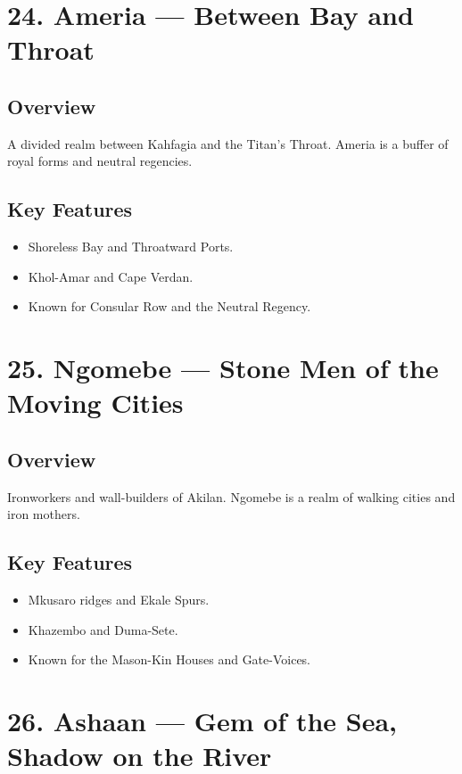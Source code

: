 \documentclass[11pt]{article}
\begin{document}
\section*{24. Ameria — Between Bay and Throat}

\subsection*{Overview}
A divided realm between Kahfagia and the Titan’s Throat. Ameria is a buffer of royal forms and neutral regencies.

\subsection*{Key Features}
\begin{itemize}[leftmargin=*]
    \item Shoreless Bay and Throatward Ports.
    \item Khol-Amar and Cape Verdan.
    \item Known for Consular Row and the Neutral Regency.
\end{itemize}

\section*{25. Ngomebe — Stone Men of the Moving Cities}

\subsection*{Overview}
Ironworkers and wall-builders of Akilan. Ngomebe is a realm of walking cities and iron mothers.

\subsection*{Key Features}
\begin{itemize}[leftmargin=*]
    \item Mkusaro ridges and Ekale Spurs.
    \item Khazembo and Duma-Sete.
    \item Known for the Mason-Kin Houses and Gate-Voices.
\end{itemize}

\section*{26. Ashaan — Gem of the Sea, Shadow on the River}
\end{document}
